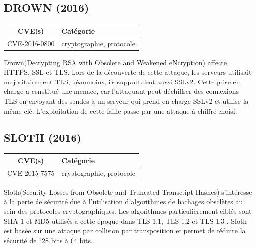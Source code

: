 

\subsection{DROWN (2016)}

\begin{tabularx}{0.96\textwidth}{|c|X|}
  \hline
  \textbf{CVE(s)} & \textbf{Catégorie} \\
  \hline
  CVE-2016-0800 & cryptographie, protocole \\
  \hline
\end{tabularx}

\vspace{1em}

Drown(Decrypting RSA with Obsolete and Weakened eNcryption) affecte HTTPS, SSL et TLS. Lors de la découverte de cette attaque, les serveurs utilisait majoritairement TLS, néanmoins, ils supportaient aussi SSLv2. Cette prise en charge a constitué une menace, car l'attaquant peut déchiffrer des connexions TLS en envoyant des sondes à un serveur qui prend en charge SSLv2 et utilise la même clé. L'exploitation de cette faille passe par une attaque à chiffré choisi\cite{drown}.




\subsection{SLOTH (2016)}

\begin{tabularx}{0.96\textwidth}{|c|X|}
  \hline
  \textbf{CVE(s)} & \textbf{Catégorie} \\
  \hline
  CVE-2015-7575 & cryptographie, protocole \\
  \hline
\end{tabularx}

\vspace{1em}

Sloth(Security Losses from Obsolete and Truncated Transcript Hashes) s'intéresse à la perte de sécurité due à l'utilisation d'algorithmes de hachages obsolètes au sein des protocoles cryptographiques. Les algorithmes particulièrement ciblés sont SHA-1 et MD5 utilisés à cette époque dans TLS 1.1, TLS 1.2 et TLS 1.3 . Sloth est basée sur une attaque par collision par transposition et permet de réduire la sécurité de 128 bits à 64 bits\cite{sloth}.


